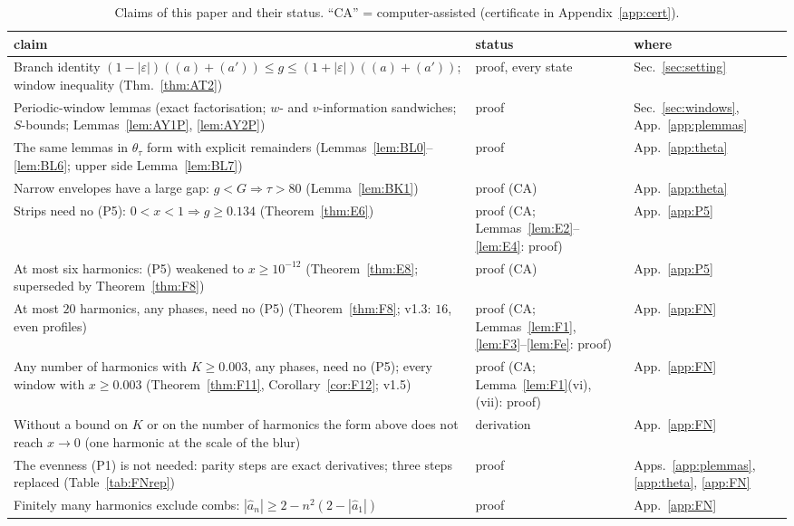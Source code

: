 \begin{table}
\caption{Claims of this paper and their status. ``CA'' = computer-assisted (certificate in Appendix~\ref{app:cert}).}
\label{tab:claims}
\begin{ruledtabular}
\begin{tabular}{p{}p{}l}
claim & status & where\\ \hline
Branch identity $(1-|\varepsilon|)((a)+(a'))\le g\le(1+|\varepsilon|)((a)+(a'))$; window inequality (Thm.~\ref{thm:AT2}) & proof, every state & Sec.~\ref{sec:setting}\\
Periodic-window lemmas (exact factorisation; $w$- and $v$-information sandwiches; $S$-bounds; Lemmas~\ref{lem:AY1P}, \ref{lem:AY2P}) & proof & Sec.~\ref{sec:windows}, App.~\ref{app:plemmas}\\
The same lemmas in $\theta_\tau$ form with explicit remainders (Lemmas~\ref{lem:BL0}--\ref{lem:BL6}; upper side Lemma~\ref{lem:BL7}) & proof & App.~\ref{app:theta}\\
Narrow envelopes have a large gap: $g<G\Rightarrow\tau>80$ (Lemma~\ref{lem:BK1}) & proof (CA) & App.~\ref{app:theta}\\
Strips need no (P5): $0<x<1\Rightarrow g\ge0.134$ (Theorem~\ref{thm:E6}) & proof (CA; Lemmas~\ref{lem:E2}--\ref{lem:E4}: proof) & App.~\ref{app:P5}\\
At most six harmonics: (P5) weakened to $x\ge10^{-12}$ (Theorem~\ref{thm:E8}; superseded by Theorem~\ref{thm:F8}) & proof (CA) & App.~\ref{app:P5}\\
At most $20$ harmonics, any phases, need no (P5) (Theorem~\ref{thm:F8}; v1.3: $16$, even profiles) & proof (CA; Lemmas~\ref{lem:F1}, \ref{lem:F3}--\ref{lem:Fe}: proof) & App.~\ref{app:FN}\\
Any number of harmonics with $K\ge0.003$, any phases, need no (P5); every window with $x\ge0.003$ (Theorem~\ref{thm:F11}, Corollary~\ref{cor:F12}; v1.5) & proof (CA; Lemma~\ref{lem:F1}(vi), (vii): proof) & App.~\ref{app:FN}\\
Without a bound on $K$ or on the number of harmonics the form above does not reach $x\to0$ (one harmonic at the scale of the blur) & derivation & App.~\ref{app:FN}\\
The evenness (P1) is not needed: parity steps are exact derivatives; three steps replaced (Table~\ref{tab:FNrep}) & proof & Apps.~\ref{app:plemmas}, \ref{app:theta}, \ref{app:FN}\\
Finitely many harmonics exclude combs: $|\hat a_n|\ge2-n^2(2-|\hat a_1|)$ & proof & App.~\ref{app:FN}\\

\end{tabular}
\end{ruledtabular}
\end{table}
